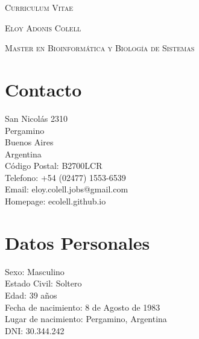 \documentclass[a4paper]{article}
\begin{document}
\pagestyle{plain}

\begin{center}
\huge{\textsc{Curriculum Vitae}}
\vspace{\baselineskip}

\Large{\textsc{Eloy Adonis Colell}}
\vspace{\baselineskip}

\small{\textsc{Master en Bioinform{\'a}tica y Biolog{\'i}a de Sistemas}}
\end{center}
\vspace{1.5\baselineskip}

\section{Contacto}
\begin{flushleft}
San Nicol{\'a}s 2310 \\
Pergamino \\
Buenos Aires \\
Argentina \\
C{\'o}digo Postal: B2700LCR \\
Telefono: +54 (02477) 1553-6539 \\
Email: eloy.colell.jobs@gmail.com \\
Homepage: ecolell.github.io\\
\end{flushleft}

\section{Datos Personales}
\begin{flushleft}
Sexo: Masculino \\
Estado Civil: Soltero \\
Edad: 39 a\~{n}os \\
Fecha de nacimiento: 8 de Agosto de 1983 \\
Lugar de nacimiento: Pergamino, Argentina \\
DNI: 30.344.242 \\
\end{flushleft}
\end{document}

